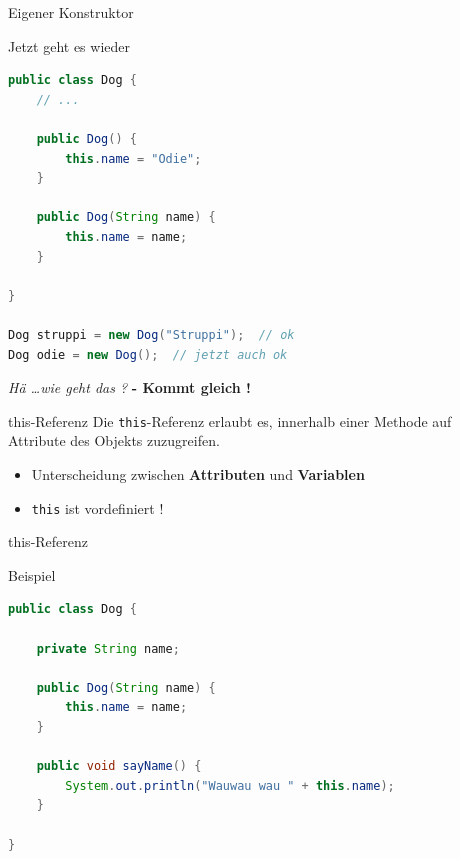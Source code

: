 \documentclass[18pt]{beamer}
\begin{document}
\begin{frame}[fragile]{Eigener Konstruktor}
    \begin{exampleblock}{Jetzt geht es wieder}
        \begin{lstlisting}[language=Java,basicstyle=\scriptsize]
public class Dog {
    // ...

    public Dog() {
        this.name = "Odie";
    }

    public Dog(String name) {
        this.name = name;
    }

}

Dog struppi = new Dog("Struppi");  // ok
Dog odie = new Dog();  // jetzt auch ok
        \end{lstlisting}

    \end{exampleblock}

    \pause
    \textit{Hä \dots wie geht das ?}
    \pause
    \textbf{- Kommt gleich !}

\end{frame}


\begin{frame}{this-Referenz}
    Die \texttt{this}-Referenz erlaubt es, innerhalb einer Methode auf Attribute des Objekts zuzugreifen.
    \begin{itemize}
        \item Unterscheidung zwischen \textbf{Attributen} und \textbf{Variablen}
        \item \texttt{this} ist vordefiniert !
    \end{itemize}
\end{frame}

\begin{frame}[fragile]{this-Referenz}
    \begin{exampleblock}{Beispiel}
        \begin{lstlisting}[language=Java]
public class Dog {

    private String name;

    public Dog(String name) {
        this.name = name;
    }

    public void sayName() {
        System.out.println("Wauwau wau " + this.name);
    }

}
        \end{lstlisting}

    \end{exampleblock}

\end{frame}
\end{document}
